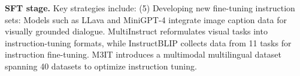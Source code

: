 \textbf{SFT stage.} Key strategies include:  
(5) Developing new fine-tuning instruction sets: Models such as LLava \cite{liu2024visual} and MiniGPT-4 \cite{zhu2023minigpt} integrate image caption data for visually grounded dialogue. MultiInstruct \cite{xu2022multiinstruct} reformulates visual tasks into instruction-tuning formats, while InstructBLIP \cite{NEURIPS2023_9a6a435e} collects data from 11 tasks for instruction fine-tuning. 
M3IT \cite{li2023large} introduces a multimodal multilingual dataset spanning 40 datasets to optimize instruction tuning.